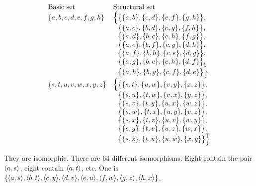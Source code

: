 \documentclass{report}
\begin{document}
\begin{exercise}
\[
\begin{array}{ll}
    \text{Basic set} & \text{Structural set}\\
    \set{a,b,c,d,e,f,g,h} & \Bigl\{ \bigl\{ \set{a,b}, \set{c,d}, \set{e,f}, \set{g,h} \bigr\},\\
               & \hphantom{\Bigl\{} \bigl\{ \set{a,c}, \set{b,d}, \set{e,g}, \set{f,h} \bigr\},\\
               & \hphantom{\Bigl\{} \bigl\{ \set{a,d}, \set{b,c}, \set{e,h}, \set{f,g} \bigr\},\\
               & \hphantom{\Bigl\{} \bigl\{ \set{a,e}, \set{b,f}, \set{c,g}, \set{d,h} \bigr\},\\
               & \hphantom{\Bigl\{} \bigl\{ \set{a,f}, \set{b,h}, \set{c,e}, \set{d,g} \bigr\},\\
               & \hphantom{\Bigl\{} \bigl\{ \set{a,g}, \set{b,e}, \set{c,h}, \set{d,f} \bigr\},\\
               & \hphantom{\Bigl\{} \bigl\{ \set{a,h}, \set{b,g}, \set{c,f}, \set{d,e} \bigr\} \Bigr\}\\
    \set{s,t,u,v,w,x,y,z} & \Bigl\{ \bigl\{ \set{s,t}, \set{u,w}, \set{v,y}, \set{x,z} \bigr\},\\
               & \hphantom{\Bigl\{} \bigl\{ \set{s,u}, \set{t,w}, \set{v,x}, \set{y,z} \bigr\},\\
               & \hphantom{\Bigl\{} \bigl\{ \set{s,v}, \set{t,y}, \set{u,x}, \set{w,z} \bigr\},\\
               & \hphantom{\Bigl\{} \bigl\{ \set{s,w}, \set{t,x}, \set{u,y}, \set{v,z} \bigr\},\\
               & \hphantom{\Bigl\{} \bigl\{ \set{s,x}, \set{t,z}, \set{u,v}, \set{w,y} \bigr\},\\
               & \hphantom{\Bigl\{} \bigl\{ \set{s,y}, \set{t,v}, \set{u,z}, \set{w,x} \bigr\},\\
               & \hphantom{\Bigl\{} \bigl\{ \set{s,z}, \set{t,u}, \set{u,w}, \set{x,y} \bigr\} \Bigr\}\\
\end{array}
\]
\end{exercise}

\begin{solution}
They are isomorphic. There are 64 different isomorphisms. Eight contain the pair
$\left\langle a, s\right\rangle$, eight contain $\left\langle a, t\right\rangle$, etc.
One is $\set{\aprn{a,s},\aprn{b,t},\aprn{c,y},\aprn{d,v},\aprn{e,u},\aprn{f,w},\aprn{g,z},\aprn{h,x}}$.
\end{solution}
\end{document}
